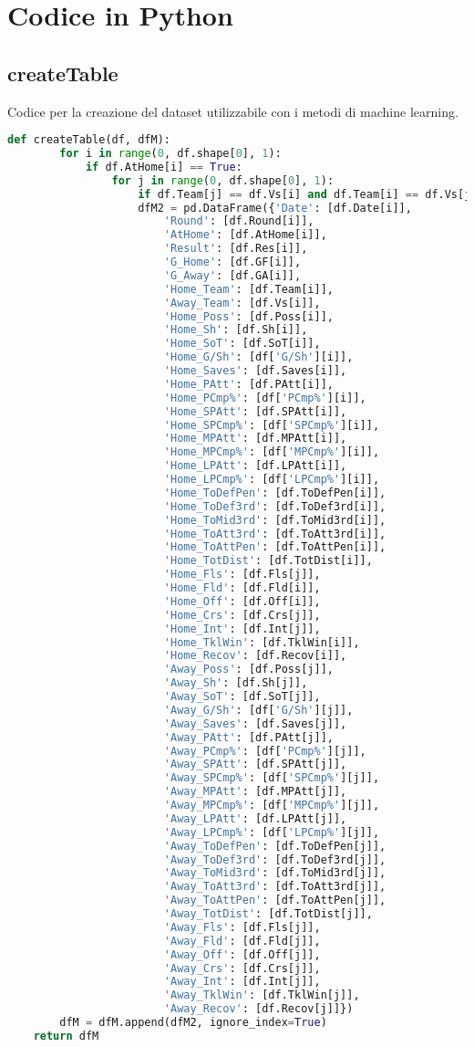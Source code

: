 \chapter{Codice in Python}
\section{createTable}
Codice per la creazione del dataset utilizzabile con i metodi di machine learning.
\begin{lstlisting}[language=Python, caption={Codice per la creazione del dataset utilizabile con i metodi di machine learning.}, captionpos=b, label=code:a9]
	def createTable(df, dfM): 
		for i in range(0, df.shape[0], 1):
			if df.AtHome[i] == True: 
				for j in range(0, df.shape[0], 1): 
					if df.Team[j] == df.Vs[i] and df.Team[i] == df.Vs[j] and df.AtHome[j] == False:
					dfM2 = pd.DataFrame({'Date': [df.Date[i]],
						'Round': [df.Round[i]],
						'AtHome': [df.AtHome[i]],
						'Result': [df.Res[i]],
						'G_Home': [df.GF[i]],
						'G_Away': [df.GA[i]],
						'Home_Team': [df.Team[i]],
						'Away_Team': [df.Vs[i]],
						'Home_Poss': [df.Poss[i]],
						'Home_Sh': [df.Sh[i]],
						'Home_SoT': [df.SoT[i]],
						'Home_G/Sh': [df['G/Sh'][i]],
						'Home_Saves': [df.Saves[i]],
						'Home_PAtt': [df.PAtt[i]],
						'Home_PCmp%': [df['PCmp%'][i]],
						'Home_SPAtt': [df.SPAtt[i]],
						'Home_SPCmp%': [df['SPCmp%'][i]],
						'Home_MPAtt': [df.MPAtt[i]],
						'Home_MPCmp%': [df['MPCmp%'][i]],
						'Home_LPAtt': [df.LPAtt[i]],
						'Home_LPCmp%': [df['LPCmp%'][i]],
						'Home_ToDefPen': [df.ToDefPen[i]],
						'Home_ToDef3rd': [df.ToDef3rd[i]],
						'Home_ToMid3rd': [df.ToMid3rd[i]],
						'Home_ToAtt3rd': [df.ToAtt3rd[i]],
						'Home_ToAttPen': [df.ToAttPen[i]],
						'Home_TotDist': [df.TotDist[i]],
						'Home_Fls': [df.Fls[j]],
						'Home_Fld': [df.Fld[i]],
						'Home_Off': [df.Off[i]],
						'Home_Crs': [df.Crs[j]],
						'Home_Int': [df.Int[j]],
						'Home_TklWin': [df.TklWin[i]],
						'Home_Recov': [df.Recov[i]],
						'Away_Poss': [df.Poss[j]],
						'Away_Sh': [df.Sh[j]],
						'Away_SoT': [df.SoT[j]],
						'Away_G/Sh': [df['G/Sh'][j]],
						'Away_Saves': [df.Saves[j]],
						'Away_PAtt': [df.PAtt[j]],
						'Away_PCmp%': [df['PCmp%'][j]],
						'Away_SPAtt': [df.SPAtt[j]],
						'Away_SPCmp%': [df['SPCmp%'][j]],
						'Away_MPAtt': [df.MPAtt[j]],
						'Away_MPCmp%': [df['MPCmp%'][j]],
						'Away_LPAtt': [df.LPAtt[j]],
						'Away_LPCmp%': [df['LPCmp%'][j]],
						'Away_ToDefPen': [df.ToDefPen[j]],
						'Away_ToDef3rd': [df.ToDef3rd[j]],
						'Away_ToMid3rd': [df.ToMid3rd[j]],
						'Away_ToAtt3rd': [df.ToAtt3rd[j]],
						'Away_ToAttPen': [df.ToAttPen[j]],
						'Away_TotDist': [df.TotDist[j]],
						'Away_Fls': [df.Fls[j]],
						'Away_Fld': [df.Fld[j]],
						'Away_Off': [df.Off[j]],
						'Away_Crs': [df.Crs[j]],
						'Away_Int': [df.Int[j]],
						'Away_TklWin': [df.TklWin[j]],
						'Away_Recov': [df.Recov[j]]})
		dfM = dfM.append(dfM2, ignore_index=True) 
	return dfM
	
\end{lstlisting}

